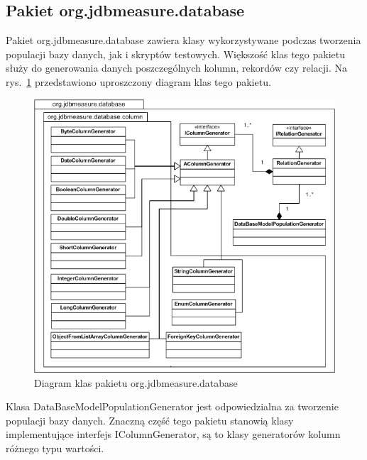 \subsection{Pakiet org.jdbmeasure.database}
Pakiet org.jdbmeasure.database zawiera klasy wykorzystywane podczas tworzenia populacji bazy danych,
jak i skryptów testowych. Większość klas tego pakietu służy do generowania danych poszczególnych kolumn, rekordów czy relacji.
Na rys.~\ref{rys:uml01} przedstawiono uproszczony diagram klas tego pakietu.
\begin{figure}[h]
\begin{center}
\includegraphics[width=1.0\linewidth]{figures/uml01.png}%
\end{center}
\caption{Diagram klas pakietu org.jdbmeasure.database}\label{rys:uml01}
\end{figure}
Klasa DataBaseModelPopulationGenerator jest odpowiedzialna za tworzenie populacji bazy danych. Znaczną część tego pakietu
stanowią klasy implementujące interfejs IColumnGenerator, są to klasy generatorów kolumn różnego typu wartości. 

